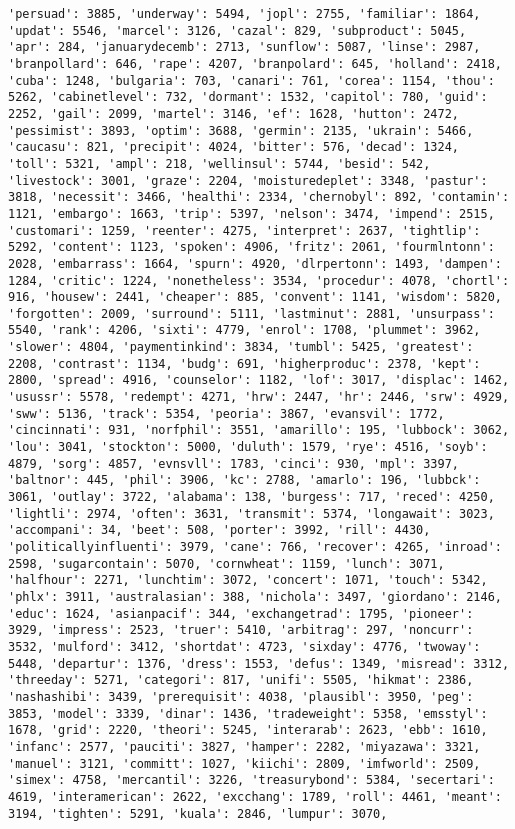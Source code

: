 \documentclass[11pt]{article}
\begin{document}
\begin{Verbatim}[commandchars=\\\{\}]
'persuad': 3885, 'underway': 5494, 'jopl': 2755, 'familiar': 1864, 'updat': 5546, 'marcel': 3126, 'cazal': 829, 'subproduct': 5045, 'apr': 284, 'januarydecemb': 2713, 'sunflow': 5087, 'linse': 2987, 'branpollard': 646, 'rape': 4207, 'branpolard': 645, 'holland': 2418, 'cuba': 1248, 'bulgaria': 703, 'canari': 761, 'corea': 1154, 'thou': 5262, 'cabinetlevel': 732, 'dormant': 1532, 'capitol': 780, 'guid': 2252, 'gail': 2099, 'martel': 3146, 'ef': 1628, 'hutton': 2472, 'pessimist': 3893, 'optim': 3688, 'germin': 2135, 'ukrain': 5466, 'caucasu': 821, 'precipit': 4024, 'bitter': 576, 'decad': 1324, 'toll': 5321, 'ampl': 218, 'wellinsul': 5744, 'besid': 542, 'livestock': 3001, 'graze': 2204, 'moisturedeplet': 3348, 'pastur': 3818, 'necessit': 3466, 'healthi': 2334, 'chernobyl': 892, 'contamin': 1121, 'embargo': 1663, 'trip': 5397, 'nelson': 3474, 'impend': 2515, 'customari': 1259, 'reenter': 4275, 'interpret': 2637, 'tightlip': 5292, 'content': 1123, 'spoken': 4906, 'fritz': 2061, 'fourmlntonn': 2028, 'embarrass': 1664, 'spurn': 4920, 'dlrpertonn': 1493, 'dampen': 1284, 'critic': 1224, 'nonetheless': 3534, 'procedur': 4078, 'chortl': 916, 'housew': 2441, 'cheaper': 885, 'convent': 1141, 'wisdom': 5820, 'forgotten': 2009, 'surround': 5111, 'lastminut': 2881, 'unsurpass': 5540, 'rank': 4206, 'sixti': 4779, 'enrol': 1708, 'plummet': 3962, 'slower': 4804, 'paymentinkind': 3834, 'tumbl': 5425, 'greatest': 2208, 'contrast': 1134, 'budg': 691, 'higherproduc': 2378, 'kept': 2800, 'spread': 4916, 'counselor': 1182, 'lof': 3017, 'displac': 1462, 'usussr': 5578, 'redempt': 4271, 'hrw': 2447, 'hr': 2446, 'srw': 4929, 'sww': 5136, 'track': 5354, 'peoria': 3867, 'evansvil': 1772, 'cincinnati': 931, 'norfphil': 3551, 'amarillo': 195, 'lubbock': 3062, 'lou': 3041, 'stockton': 5000, 'duluth': 1579, 'rye': 4516, 'soyb': 4879, 'sorg': 4857, 'evnsvll': 1783, 'cinci': 930, 'mpl': 3397, 'baltnor': 445, 'phil': 3906, 'kc': 2788, 'amarlo': 196, 'lubbck': 3061, 'outlay': 3722, 'alabama': 138, 'burgess': 717, 'reced': 4250, 'lightli': 2974, 'often': 3631, 'transmit': 5374, 'longawait': 3023, 'accompani': 34, 'beet': 508, 'porter': 3992, 'rill': 4430, 'politicallyinfluenti': 3979, 'cane': 766, 'recover': 4265, 'inroad': 2598, 'sugarcontain': 5070, 'cornwheat': 1159, 'lunch': 3071, 'halfhour': 2271, 'lunchtim': 3072, 'concert': 1071, 'touch': 5342, 'phlx': 3911, 'australasian': 388, 'nichola': 3497, 'giordano': 2146, 'educ': 1624, 'asianpacif': 344, 'exchangetrad': 1795, 'pioneer': 3929, 'impress': 2523, 'truer': 5410, 'arbitrag': 297, 'noncurr': 3532, 'mulford': 3412, 'shortdat': 4723, 'sixday': 4776, 'twoway': 5448, 'departur': 1376, 'dress': 1553, 'defus': 1349, 'misread': 3312, 'threeday': 5271, 'categori': 817, 'unifi': 5505, 'hikmat': 2386, 'nashashibi': 3439, 'prerequisit': 4038, 'plausibl': 3950, 'peg': 3853, 'model': 3339, 'dinar': 1436, 'tradeweight': 5358, 'emsstyl': 1678, 'grid': 2220, 'theori': 5245, 'interarab': 2623, 'ebb': 1610, 'infanc': 2577, 'pauciti': 3827, 'hamper': 2282, 'miyazawa': 3321, 'manuel': 3121, 'committ': 1027, 'kiichi': 2809, 'imfworld': 2509, 'simex': 4758, 'mercantil': 3226, 'treasurybond': 5384, 'secertari': 4619, 'interamerican': 2622, 'excchang': 1789, 'roll': 4461, 'meant': 3194, 'tighten': 5291, 'kuala': 2846, 'lumpur': 3070, 
\end{Verbatim}
\end{document}
